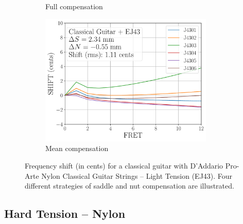 \begin{figure}
\begin{subfigure}[b]{0.45\textwidth}
   \caption{Full compensation}
   \label{fig:shift_classicalguitar_ej43_full}
  \end{subfigure}
  \hspace{0.25in}
  \begin{subfigure}[b]{0.45\textwidth}
   \centering
   \includegraphics[width=3.25in]{../figures/shift_classicalguitar_ej43_mean}
   \caption{Mean compensation}
   \label{fig:shift_classicalguitar_ej43_mean}
  \end{subfigure}
  \caption{\label{fig:compensation_classicalguitar_ej43} Frequency shift (in cents) for a classical guitar with D'Addario Pro-Arte Nylon Classical Guitar Strings -- Light Tension (EJ43). Four different strategies of saddle and nut compensation are illustrated.}
 \end{figure}

 \newpage
 \subsection{Hard Tension -- Nylon}


